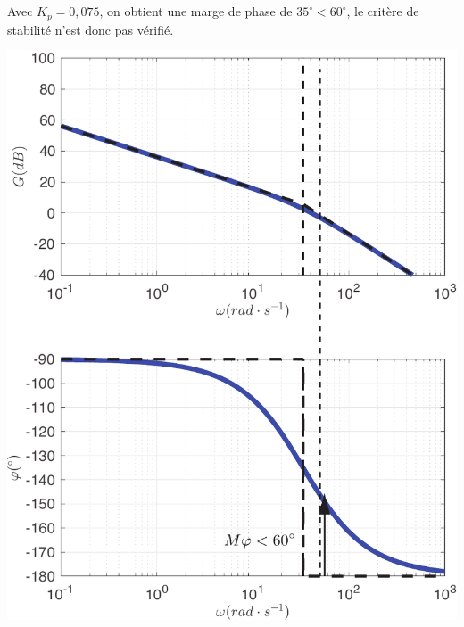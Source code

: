 \documentclass[10pt,fleqn]{article} %
\begin{document}
\begin{multicols}{2}
\subparagraph{}\textit{}%

Avec $K_p=0,075$, on obtient une marge de phase de $35^{\circ}<60^{\circ}$, le critère de stabilité n'est donc pas vérifié.

\begin{center}
\includegraphics[width=1.0\linewidth]{images/matlab/bode_total.pdf}
\end{center}

\subparagraph{}%


\end{multicols}
\end{document}
